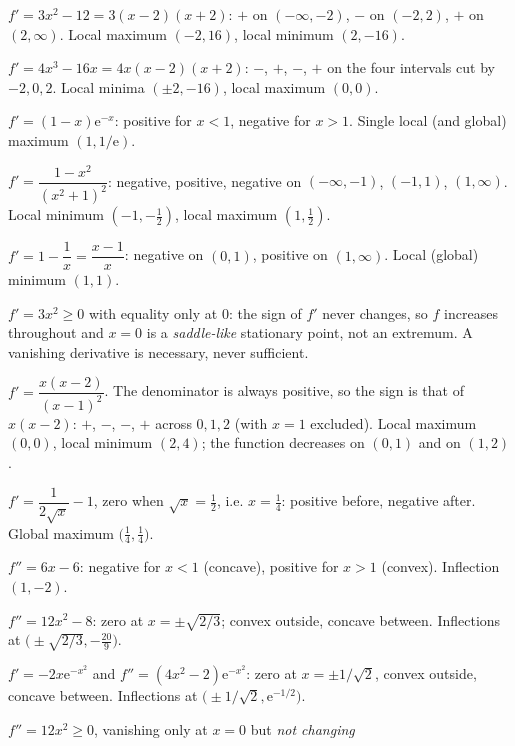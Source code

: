 \begin{solutions}
  \item $f'=3x^{2}-12=3(x-2)(x+2)$: $+$ on $(-\infty,-2)$, $-$ on
        $(-2,2)$, $+$ on $(2,\infty)$. Local maximum $(-2,16)$, local
        minimum $(2,-16)$.
  \item $f'=4x^{3}-16x=4x(x-2)(x+2)$: $-$, $+$, $-$, $+$ on the four
        intervals cut by $-2,0,2$. Local minima $(\pm2,-16)$, local maximum
        $(0,0)$.
  \item $f'=(1-x)\mathrm{e}^{-x}$: positive for $x<1$, negative for $x>1$.
        Single local (and global) maximum $(1,1/\mathrm{e})$.
  \item $f'=\dfrac{1-x^{2}}{(x^{2}+1)^{2}}$: negative, positive, negative
        on $(-\infty,-1)$, $(-1,1)$, $(1,\infty)$. Local minimum
        $(-1,-\tfrac12)$, local maximum $(1,\tfrac12)$.
  \item $f'=1-\dfrac1x=\dfrac{x-1}{x}$: negative on $(0,1)$, positive on
        $(1,\infty)$. Local (global) minimum $(1,1)$.
  \item $f'=3x^{2}\ge0$ with equality only at $0$: the sign of $f'$ never
        changes, so $f$ increases throughout and $x=0$ is a
        \emph{saddle-like} stationary point, not an extremum. A vanishing
        derivative is necessary, never sufficient.
  \item $f'=\dfrac{x(x-2)}{(x-1)^{2}}$. The denominator is always positive,
        so the sign is that of $x(x-2)$: $+$, $-$, $-$, $+$ across
        $0,1,2$ (with $x=1$ excluded). Local maximum $(0,0)$, local minimum
        $(2,4)$; the function decreases on $(0,1)$ and on $(1,2)$.
  \item $f'=\dfrac{1}{2\sqrt{x}}-1$, zero when $\sqrt{x}=\tfrac12$, i.e.
        $x=\tfrac14$: positive before, negative after. Global maximum
        $\bigl(\tfrac14,\tfrac14\bigr)$.
  \item $f''=6x-6$: negative for $x<1$ (concave), positive for $x>1$
        (convex). Inflection $(1,-2)$.
  \item $f''=12x^{2}-8$: zero at $x=\pm\sqrt{2/3}$; convex outside,
        concave between. Inflections at
        $\bigl(\pm\sqrt{2/3},-\tfrac{20}{9}\bigr)$.
  \item $f'=-2x\mathrm{e}^{-x^{2}}$ and
        $f''=(4x^{2}-2)\mathrm{e}^{-x^{2}}$: zero at
        $x=\pm1/\sqrt2$, convex outside, concave between. Inflections at
        $\bigl(\pm1/\sqrt2,\mathrm{e}^{-1/2}\bigr)$.
  \item $f''=12x^{2}\ge0$, vanishing only at $x=0$ but \emph{not changing
}
\end{solutions}
